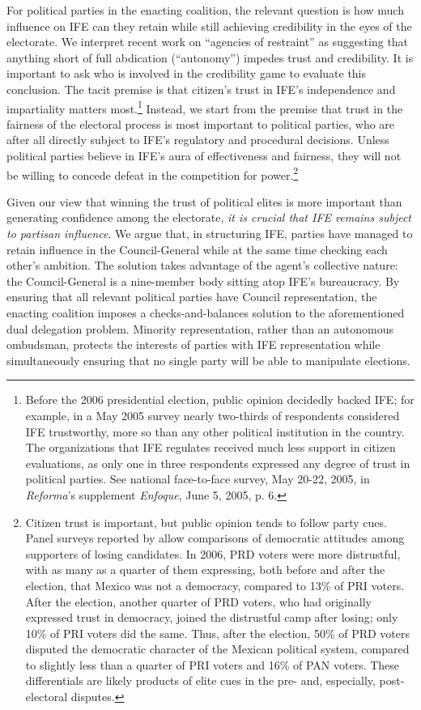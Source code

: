 \documentclass[12 pt, letter]{article}
\begin{document}
For political parties in the enacting coalition, the relevant
question is how much influence on IFE can they retain while still
achieving credibility in the eyes of the electorate.  We interpret
recent work on ``agencies of restraint'' \citep{Schedler1999,
Eisenstadt2004} as suggesting that anything short of full abdication
(``autonomy'') impedes trust and credibility.  It is important to
ask who is involved in the credibility game to evaluate this
conclusion.  The tacit premise is that citizen's trust in IFE's
independence and impartiality matters most.\footnote{Before the 2006
presidential election, public opinion decidedly backed IFE; for
example, in a May 2005 survey nearly two-thirds of respondents
considered IFE trustworthy, more so than any other political
institution in the country.  The organizations that IFE regulates
received much less support in citizen evaluations, as only one in
three respondents expressed any degree of trust in political
parties.  See national face-to-face survey, May 20-22, 2005, in
\emph{Reforma}'s supplement \emph{Enfoque}, June 5, 2005, p. 6.}
Instead, we start from the premise that trust in the fairness of the
electoral process is most important to political parties, who are
after all directly subject to IFE's regulatory and procedural
decisions.  Unless political parties believe in IFE's aura of
effectiveness and fairness, they will not be willing to concede
defeat in the competition for power.\footnote{Citizen trust is
important, but public opinion tends to follow party cues.  Panel
surveys reported by \citet{Estrada2007} allow comparisons of
democratic attitudes among supporters of losing candidates. In 2006,
PRD voters were more distrustful, with as many as a quarter of them
expressing, both before and after the election, that Mexico was not
a democracy, compared to 13\% of PRI voters. After the election,
another quarter of PRD voters, who had originally expressed  trust
in democracy, joined the distrustful camp after losing; only 10\% of
PRI voters did the same. Thus, after the election, 50\% of PRD
voters disputed the democratic character of the Mexican political
system, compared to slightly less than a quarter of PRI voters and
16\% of PAN voters.  These differentials are likely products of
elite cues in the pre- and, especially, post-electoral disputes.}

Given our view that winning the trust of political elites is more
important than generating confidence among the electorate, \emph{it
is crucial that IFE remains subject to partisan influence}. We argue
that, in structuring IFE, parties have managed to retain influence
in the Council-General while at the same time checking each other's
ambition.  The solution takes advantage of the agent's collective
nature: the Council-General is a nine-member body sitting atop IFE's
bureaucracy.  By ensuring that all relevant political parties have
Council representation, the enacting coalition imposes a
checks-and-balances solution to the aforementioned dual delegation
problem. Minority representation, rather than an autonomous
ombudsman, protects the interests of parties with IFE representation
while simultaneously ensuring that no single party will be able to
manipulate elections.
\end{document}
